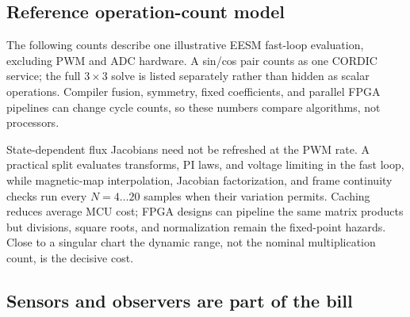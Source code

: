 \subsection{Reference operation-count model}

The following counts describe one illustrative EESM fast-loop evaluation,
excluding PWM and ADC hardware. A sin/cos pair counts as one CORDIC service;
the full \(3\times3\) solve is listed separately rather than hidden as scalar
operations. Compiler fusion, symmetry, fixed coefficients, and parallel FPGA
pipelines can change cycle counts, so these numbers compare algorithms, not
processors.

\begin{center}
\end{center}



State-dependent flux Jacobians need not be refreshed at the PWM rate. A
practical split evaluates transforms, PI laws, and voltage limiting in the
fast loop, while magnetic-map interpolation, Jacobian factorization, and
frame continuity checks run every \(N=4\ldots20\) samples when their variation
permits. Caching reduces average MCU cost; FPGA designs can pipeline the same
matrix products but divisions, square roots, and normalization remain the
fixed-point hazards. Close to a singular chart the dynamic range, not the
nominal multiplication count, is the decisive cost.



\subsection{Sensors and observers are part of the bill}


